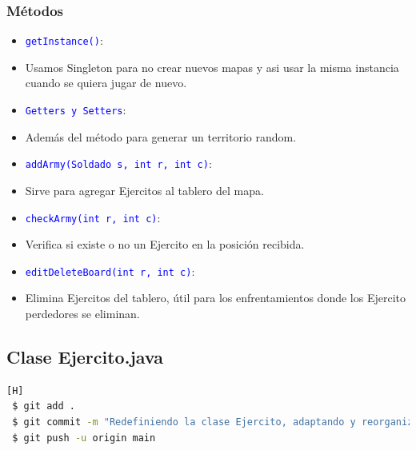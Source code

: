 \documentclass{article}
\begin{document}
\subsubsection{Métodos}
\begin{itemize}
    \item \texttt{\textcolor{blue}{getInstance()}}: 
    \item Usamos Singleton para no crear nuevos mapas y asi usar la misma instancia cuando se quiera jugar de nuevo.
\end{itemize}

\begin{itemize}
    \item \texttt{\textcolor{blue}{Getters y Setters}}: 
    \item Además del método para generar un territorio random.
\end{itemize}

\begin{itemize}
    \item \texttt{\textcolor{blue}{addArmy(Soldado s, int r, int c)}}: 
    \item Sirve para agregar Ejercitos al tablero del mapa.
\end{itemize}

\begin{itemize}
    \item \texttt{\textcolor{blue}{checkArmy(int r, int c)}}: 
    \item Verifica si existe o no un Ejercito en la posición recibida.
\end{itemize}

\begin{itemize}
    \item \texttt{\textcolor{blue}{editDeleteBoard(int r, int c)}}: 
    \item Elimina Ejercitos del tablero, útil para los enfrentamientos donde los Ejercito perdedores se eliminan.
\end{itemize}



\subsection{Clase Ejercito.java}
\begin{lstlisting}[language=bash,caption={Commit \href{https://github.com/hernanchoquehuanca/fp2-23b/commit/94bd50accf6a9c7aaf3aebd286fbfba93da2e5d8}{94bd50a}: Redefiniendo la clase Ejercito, adaptando y reorganizando su contenido}][H]
 $ git add .
 $ git commit -m "Redefiniendo la clase Ejercito, adaptando y reorganizando su contenido"			
 $ git push -u origin main
\end{lstlisting}
\end{document}
